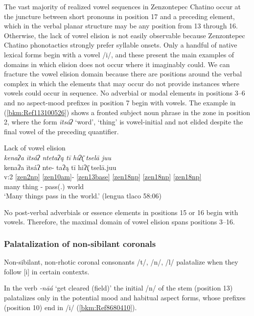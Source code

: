 \documentclass[output=paper]{langscibook}
\begin{document}
\label{bkm:Ref113308340}
The vast majority of realized vowel sequences in Zenzontepec Chatino occur at the juncture between short pronouns in position 17 and a preceding element, which in the verbal planar structure may be any position from 13 through 16. Otherwise, the lack of vowel elision is not easily observable because Zenzontepec Chatino phonotactics strongly prefer syllable onsets. Only a handful of native lexical forms begin with a vowel /i/, and these present the main examples of domains in which elision does not occur where it imaginably could. We can fracture the vowel elision domain because there are positions around the verbal complex in which the elements that may occur do not provide instances where vowels could occur in sequence. No adverbial or modal elements in positions 3{}--6 and no aspect-mood prefixes in position 7 begin with vowels. The example in (\ref{bkm:Ref113100526}) shows a fronted subject noun phrase in the zone in position 2, where the form \textit{ītsáʔ} `word', `thing' is vowel-initial and not elided despite the final vowel of the preceding quantifier.


\ea\label{bkm:Ref113100526}Lack of vowel elision \\
\textit{kenaʔa ītsáʔ ntetaʔą tī hiʔ\={\k{ı}} tselā juu}\\
\glll kenaʔa ītsáʔ nte- taʔą tī hiʔ\={\k{ı}}  tselā.juu\\
v:2  \ref{zen2np} \ref{zen10am}{}- \ref{zen13base} \ref{zen18np} \ref{zen18np} \ref{zen18np} \\
many thing \Prog{}- pass(.\Third{}) \Tplz{} \Dat{} world\\
\glt `Many things pass in the world.' (lengua tlaco 58:06)  
\z

No post-verbal adverbials or essence elements in positions 15 or 16 begin with vowels. Therefore, the maximal domain of vowel elision spans positions 3{}--16.

\subsubsection{Palatalization of non-sibilant coronals} 

Non-sibilant, non-rhotic coronal consonants /t/, /n/, /l/ palatalize when they follow [i] in certain contexts.

\label{bkm:Ref113308359}
In the verb \textit{\nobreakdash-nāá} `get cleared (field)' the initial /n/ of the stem (position 13) palatalizes only in the potential mood and habitual aspect forms, whose prefixes (position 10) end in /i/ (\ref{bkm:Ref8680410}).
\end{document}

